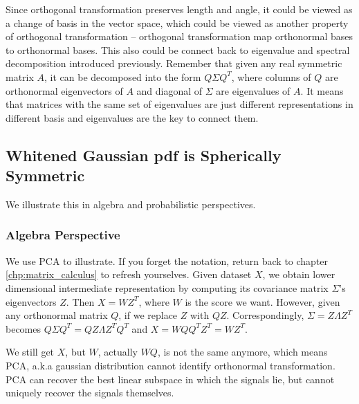 \documentclass[a4paper]{book}
\begin{document}
    Since orthogonal transformation preserves length and angle, it could
    be viewed as a change of basis in the vector space, which could be
    viewed as another property of orthogonal transformation -- orthogonal
    transformation map orthonormal bases to orthonormal bases. This also
    could be connect back to eigenvalue and spectral decomposition
    introduced previously. Remember that given any real symmetric matrix
    $A$, it can be decomposed into the form $Q\Sigma Q^{T}$, where columns
    of $Q$ are orthonormal eigenvectors of $A$ and diagonal of $\Sigma$
    are eigenvalues of $A$. It means that matrices with the same set of
    eigenvalues are just different representations in different basis and
    eigenvalues are the key to connect them.

    \subsection{Whitened Gaussian pdf is Spherically Symmetric}

    We illustrate this in algebra and probabilistic perspectives.

      \subsubsection{Algebra Perspective}
      We use PCA to illustrate. If you forget the notation, return back
      to chapter \ref{chp:matrix_calculus} to refresh yourselves. Given
      dataset $X$, we obtain lower dimensional intermediate
      representation by computing its covariance matrix $\Sigma$'s eigenvectors
      $Z$. Then $X = WZ^{T}$, where $W$ is the score we want. However, given
      any orthonormal matrix $Q$, if we replace $Z$ with $QZ$.
      Correspondingly, $\Sigma = Z\Lambda Z^{T}$ becomes $Q\Sigma Q^{T}
      = QZ\Lambda Z^{T}Q^{T}$ and $X = WQQ^{T}Z^{T} = WZ^{T}$.

      We still get $X$, but $W$, actually $WQ$, is not the same anymore,
      which means PCA, a.k.a gaussian distribution cannot identify
      orthonormal transformation. PCA can recover the best linear
      subspace in which the signals lie, but cannot uniquely recover the
      signals themselves.
\end{document}
